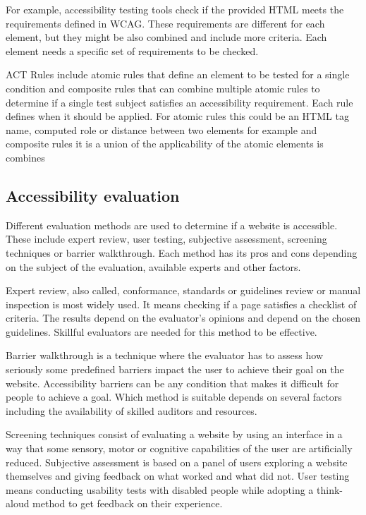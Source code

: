 \documentclass{master_thesis}
\begin{document}
For example, accessibility testing tools check if the provided HTML meets the requirements defined in WCAG. These requirements are different for each element, but they might be also combined and include more criteria. Each element needs a specific set of requirements to be checked.

ACT Rules include atomic rules that define an element to be tested for a single condition and composite rules that can combine multiple atomic rules to determine if a single test subject satisfies an accessibility requirement. Each rule defines when it should be applied. For atomic rules this could be an HTML tag name, computed role or distance between two elements for example and composite rules it is a union of the applicability of the atomic elements is combines  \citep{Fiers2019}

\subsection{Accessibility evaluation}


Different evaluation methods are used to determine if a website is accessible. These include expert review, user testing, subjective assessment, screening techniques or barrier walkthrough. Each method has its pros and cons depending on the subject of the evaluation, available experts and other factors.

Expert review, also called, conformance, standards or guidelines review or manual inspection is most widely used. It means checking if a page satisfies a checklist of criteria. The results depend on the evaluator's opinions and depend on the chosen guidelines. Skillful evaluators are needed for this method to be effective. \citep{Brajnik2008}

Barrier walkthrough is a technique where the evaluator has to assess how seriously some predefined barriers impact the user to achieve their goal on the website. Accessibility barriers can be any condition that makes it difficult for people to achieve a goal. Which method is suitable depends on several factors including the availability of skilled auditors and resources. \citep{Brajnik2008}

Screening techniques consist of evaluating a website by using an interface in a way that some sensory, motor or cognitive capabilities of the user are artificially reduced. Subjective assessment is based on a panel of users exploring a website themselves and giving feedback on what worked and what did not. User testing means conducting usability tests with disabled people while adopting a think-aloud method to get feedback on their experience. \citep{Brajnik2008}
\end{document}
